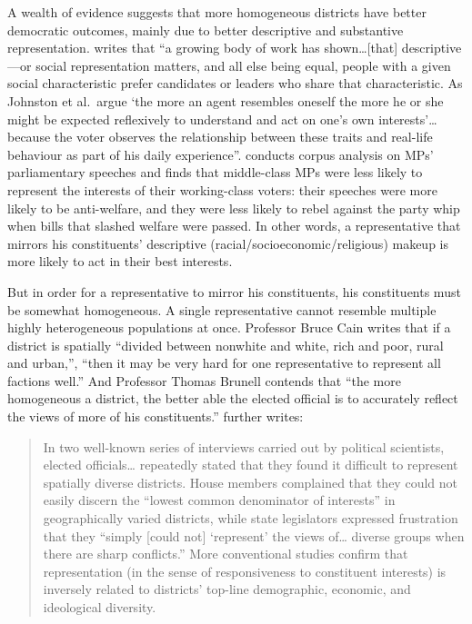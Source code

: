 \documentclass[]{article}
\begin{document}
A wealth of evidence suggests that more homogeneous districts have
better democratic outcomes, mainly due to better descriptive and
substantive representation. \cite{heath2018} writes that ``a growing
body of work has shown\ldots{}{[}that{]} descriptive---or social
representation matters, and all else being equal, people with a given
social characteristic prefer candidates or leaders who share that
characteristic. As Johnston et al.~argue `the more an agent resembles
oneself the more he or she might be expected reflexively to understand
and act on one's own interests'\ldots{} because the voter observes the
relationship between these traits and real-life behaviour as part of his
daily experience''. \cite{ogrady2018} conducts corpus analysis on MPs'
parliamentary speeches and finds that middle-class MPs were less likely
to represent the interests of their working-class voters: their speeches
were more likely to be anti-welfare, and they were less likely to rebel
against the party whip when bills that slashed welfare were passed. In
other words, a representative that mirrors his constituents' descriptive
(racial/socioeconomic/religious) makeup is more likely to act in their
best interests.

But in order for a representative to mirror his constituents, his
constituents must be somewhat homogeneous. A single representative
cannot resemble multiple highly heterogeneous populations at once.
Professor Bruce Cain writes that if a district is spatially ``divided
between nonwhite and white, rich and poor, rural and urban,'', ``then it
may be very hard for one representative to represent all factions
well.'' And Professor Thomas Brunell contends that ``the more
homogeneous a district, the better able the elected official is to
accurately reflect the views of more of his constituents.''
\cite{steph2012} further writes:

\begin{quote}
In two well-known series of interviews carried out by political
scientists, elected officials\ldots{} repeatedly stated that they found
it difficult to represent spatially diverse districts. House members
complained that they could not easily discern the ``lowest common
denominator of interests'' in geographically varied districts, while
state legislators expressed frustration that they ``simply {[}could
not{]} `represent' the views of\ldots{} diverse groups when there are
sharp conflicts.'' More conventional studies confirm that representation
(in the sense of responsiveness to constituent interests) is inversely
related to districts' top-line demographic, economic, and ideological
diversity.
\end{quote}
\end{document}

